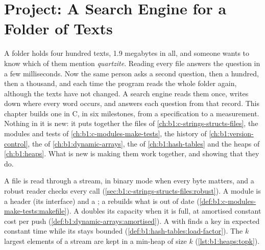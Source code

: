 \chapter{Project: A Search Engine for a Folder of Texts}\label{ch:b1:project-text-search-engine}

A folder holds four hundred texts, 1.9 megabytes in all, and someone wants to know which of them mention
\emph{quartzite}. Reading every file answers the question in a few milliseconds. Now the same person asks a second
question, then a hundred, then a thousand, and each time the program reads the whole folder again, although the texts
have not changed. A search engine reads them once, writes down where every word occurs, and answers each question from
that record. This chapter builds one in C, in six milestones, from a specification to a measurement. Nothing in it is
new: it puts together the files of \cref{ch:b1:c-strings-structs-files}, the modules and tests of
\cref{ch:b1:c-modules-make-tests}, the history of \cref{ch:b1:version-control}, the  of
\cref{ch:b1:dynamic-arrays}, the  of \cref{ch:b1:hash-tables} and the heaps of \cref{ch:b1:heaps}. What is
new is making them work together, and showing that they do.

\begin{recall}
A file is read through a stream, in binary mode when every byte matters, and a robust reader checks every call
(\cref{sec:b1:c-strings-structs-files:robust}). A module is a header (its interface) and a ; a 
rebuilds what is out of date (\cref{def:b1:c-modules-make-tests:makefile}). A  doubles its capacity when
it is full, at amortised constant cost per push (\cref{def:b1:dynamic-arrays:amortised}). A  with  finds a key in expected constant time while its  stays bounded
(\cref{def:b1:hash-tables:load-factor}). The $k$ largest elements of a stream are kept in a min-heap of size $k$
(\cref{lst:b1:heaps:topk}).
\end{recall}

